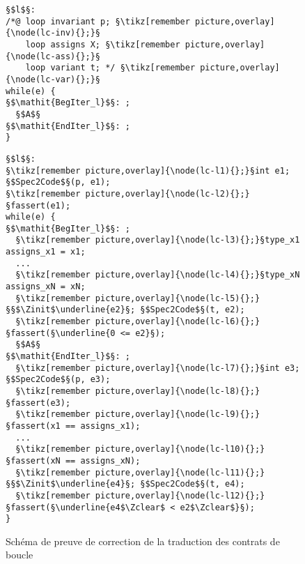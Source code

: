 \begin{figure}[bt]
  \begin{minipage}{0.65\textwidth}
    \begin{lstlisting}[escapechar=§]
§$l$§:
/*@ loop invariant p; §\tikz[remember picture,overlay]{\node(lc-inv){};}§
    loop assigns X; §\tikz[remember picture,overlay]{\node(lc-ass){};}§
    loop variant t; */ §\tikz[remember picture,overlay]{\node(lc-var){};}§
while(e) {
§$\mathit{BegIter_l}$§: ;
  §$A$§
§$\mathit{EndIter_l}$§: ;
}
    \end{lstlisting}
  \end{minipage}\hfill
  \begin{minipage}{0.49\textwidth}
    \begin{lstlisting}[escapechar=§]
§$l$§:
§\tikz[remember picture,overlay]{\node(lc-l1){};}§int e1; §$Spec2Code$§(p, e1);
§\tikz[remember picture,overlay]{\node(lc-l2){};}§fassert(e1);
while(e) {
§$\mathit{BegIter_l}$§: ;
  §\tikz[remember picture,overlay]{\node(lc-l3){};}§type_x1 assigns_x1 = x1;
  ...
  §\tikz[remember picture,overlay]{\node(lc-l4){};}§type_xN assigns_xN = xN;
  §\tikz[remember picture,overlay]{\node(lc-l5){};}§§$\Zinit$\underline{e2}§; §$Spec2Code$§(t, e2);
  §\tikz[remember picture,overlay]{\node(lc-l6){};}§fassert(§\underline{0 <= e2}§);
  §$A$§
§$\mathit{EndIter_l}$§: ;
  §\tikz[remember picture,overlay]{\node(lc-l7){};}§int e3; §$Spec2Code$§(p, e3);
  §\tikz[remember picture,overlay]{\node(lc-l8){};}§fassert(e3);
  §\tikz[remember picture,overlay]{\node(lc-l9){};}§fassert(x1 == assigns_x1);
  ...
  §\tikz[remember picture,overlay]{\node(lc-l10){};}§fassert(xN == assigns_xN);
  §\tikz[remember picture,overlay]{\node(lc-l11){};}§§$\Zinit$\underline{e4}§; §$Spec2Code$§(t, e4);
  §\tikz[remember picture,overlay]{\node(lc-l12){};}§fassert(§\underline{e4$\Zclear$ < e2$\Zclear$}§);
}
    \end{lstlisting}
  \end{minipage}
  \caption{Schéma de preuve de correction de la traduction des contrats de
    boucle}
  \label{fig:proof-loop-contract}
\end{figure}

